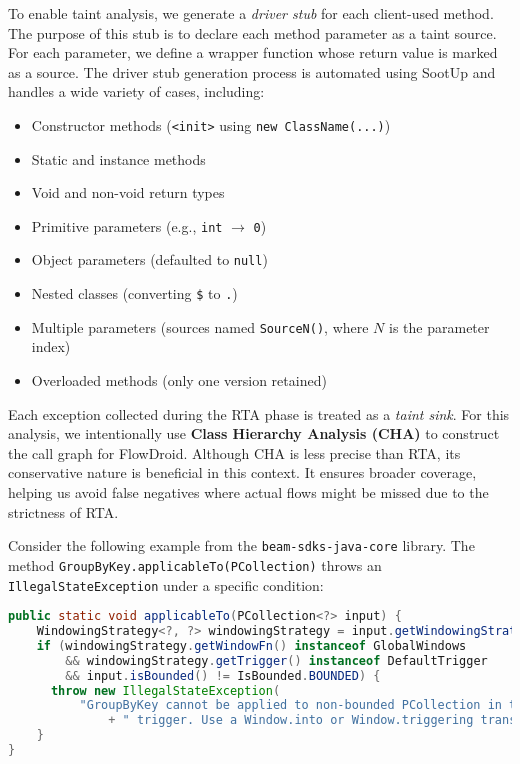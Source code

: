 To enable taint analysis, we generate a \textit{driver stub} for each client-used method. The purpose of this stub is to declare each method parameter as a taint source. For each parameter, we define a wrapper function whose return value is marked as a source. The driver stub generation process is automated using SootUp and handles a wide variety of cases, including:
\begin{itemize}
  \item Constructor methods (\texttt{<init>} using \texttt{new ClassName(...)})
  \item Static and instance methods
  \item Void and non-void return types
  \item Primitive parameters (e.g., \texttt{int} $\rightarrow$ \texttt{0})
  \item Object parameters (defaulted to \texttt{null})
  \item Nested classes (converting \texttt{\$} to \texttt{.})
  \item Multiple parameters (sources named \texttt{SourceN()}, where $N$ is the parameter index)
  \item Overloaded methods (only one version retained)
\end{itemize}

Each exception collected during the RTA phase is treated as a \textit{taint sink}. For this analysis, we intentionally use \textbf{Class Hierarchy Analysis (CHA)} to construct the call graph for FlowDroid. Although CHA is less precise than RTA, its conservative nature is beneficial in this context. It ensures broader coverage, helping us avoid false negatives where actual flows might be missed due to the strictness of RTA.

Consider the following example from the \texttt{beam-sdks-java-core} library. The method \texttt{GroupByKey.applicableTo(PCollection)} throws an \texttt{IllegalStateException} under a specific condition:
\begin{lstlisting}[language=Java,breaklines=true,breakatwhitespace=false,basicstyle=\scriptsize\ttfamily]
public static void applicableTo(PCollection<?> input) {
    WindowingStrategy<?, ?> windowingStrategy = input.getWindowingStrategy();
    if (windowingStrategy.getWindowFn() instanceof GlobalWindows
        && windowingStrategy.getTrigger() instanceof DefaultTrigger
        && input.isBounded() != IsBounded.BOUNDED) {
      throw new IllegalStateException(
          "GroupByKey cannot be applied to non-bounded PCollection in the GlobalWindow without a"
              + " trigger. Use a Window.into or Window.triggering transform prior to GroupByKey.");
    }
}
\end{lstlisting}

